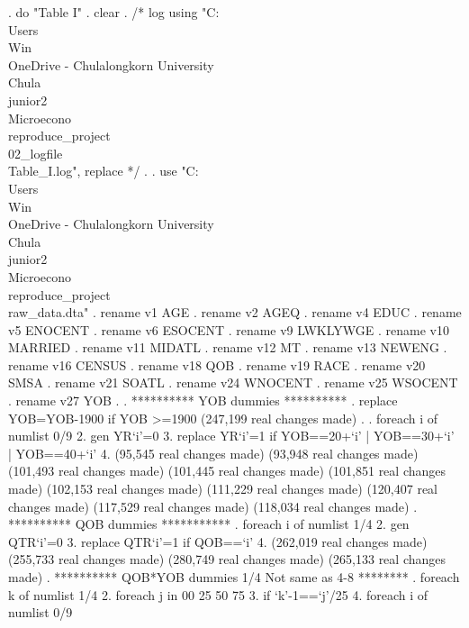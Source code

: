 . do "Table I"
{\smallskip}
. clear
{\smallskip}
. /* log using "C:\\Users\\Win\\OneDrive - Chulalongkorn University\\Chula\\junior2\\Microecono\\reproduce_project\\02_logfile\\Table_I.log", replace  */
. 
. use "C:\\Users\\Win\\OneDrive - Chulalongkorn University\\Chula\\junior2\\Microecono\\reproduce_project\\raw_data.dta"
{\smallskip}
. rename v1 AGE
{\smallskip}
. rename v2 AGEQ
{\smallskip}
. rename v4 EDUC
{\smallskip}
. rename v5 ENOCENT
{\smallskip}
. rename v6 ESOCENT
{\smallskip}
. rename v9 LWKLYWGE
{\smallskip}
. rename v10 MARRIED
{\smallskip}
. rename v11 MIDATL
{\smallskip}
. rename v12 MT
{\smallskip}
. rename v13 NEWENG
{\smallskip}
. rename v16 CENSUS
{\smallskip}
. rename v18 QOB
{\smallskip}
. rename v19 RACE
{\smallskip}
. rename v20 SMSA
{\smallskip}
. rename v21 SOATL
{\smallskip}
. rename v24 WNOCENT
{\smallskip}
. rename v25 WSOCENT
{\smallskip}
. rename v27 YOB
{\smallskip}
. 
. **********  YOB dummies **********
. replace YOB=YOB-1900 if YOB >=1900
(247,199 real changes made)
{\smallskip}
. 
. foreach i of numlist 0/9 {\lbr}
  2.         gen YR`i'=0
  3.         replace YR`i'=1 if YOB==20+`i' | YOB==30+`i' | YOB==40+`i' 
  4. {\rbr}
(95,545 real changes made)
(93,948 real changes made)
(101,493 real changes made)
(101,445 real changes made)
(101,851 real changes made)
(102,153 real changes made)
(111,229 real changes made)
(120,407 real changes made)
(117,529 real changes made)
(118,034 real changes made)
{\smallskip}
. **********  QOB dummies ***********
. foreach i of numlist 1/4 {\lbr}
  2.         gen QTR`i'=0
  3.         replace QTR`i'=1 if QOB==`i'
  4. {\rbr}
(262,019 real changes made)
(255,733 real changes made)
(280,749 real changes made)
(265,133 real changes made)
{\smallskip}
. **********  QOB*YOB dummies  1/4 Not same as 4-8 ********
. foreach k of numlist 1/4 {\lbr}
  2. foreach j in 00 25 50 75 {\lbr}
  3.         if `k'-1==`j'/25{\lbr}
  4.         foreach i of numlist 0/9 {\lbr}
